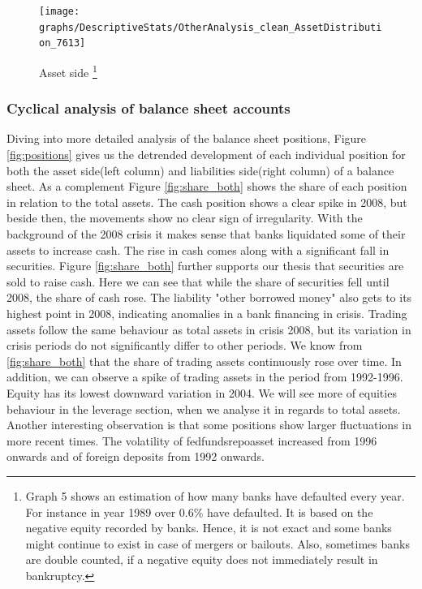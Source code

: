 \documentclass[12pt, a4paper]{article} %
\begin{document}
  
\begin{figure}[hbtp]
\begin{minipage}{\textwidth}
\centering
\caption[1]{Asset side \footnote{Graph 5 shows an estimation of how many banks have defaulted every year. For instance in year 1989 over $0.6\%$ have defaulted. It is based on the negative equity recorded by banks. Hence, it is not exact and some banks might continue to exist in case of mergers or bailouts. Also, sometimes banks are double counted, if a negative equity does not immediately result in bankruptcy.}}
\texttt{[image: graphs/DescriptiveStats/OtherAnalysis\_clean\_AssetDistribution\_7613]}
\label{fig:assets}
\end{minipage}
\end{figure}

\subsubsection{Cyclical analysis of balance sheet accounts}
Diving into more detailed analysis of the balance sheet positions, Figure \ref{fig:positions} gives us the detrended development of each individual position for both the asset side(left column) and liabilities side(right column) of a balance sheet. As a complement Figure \ref{fig:share_both} shows the share of each position in relation to the total assets. 
The cash position shows a clear spike in 2008, but beside then, the movements show no clear sign of irregularity. With the background of the 2008 crisis it makes sense that banks liquidated some of their assets to increase cash. The rise in cash comes along with a significant fall in securities. Figure \ref{fig:share_both} further supports our thesis that securities are sold to raise cash. Here we can see that while the share of securities fell until 2008, the share of cash rose.
The liability "other borrowed money" also gets to its highest point in 2008, indicating anomalies in a bank financing in crisis.
Trading assets follow the same behaviour as total assets in crisis 2008, but its variation in crisis periods do not significantly differ to other periods. We know from \ref{fig:share_both} that the share of trading assets continuously rose over time. In addition, we can observe a spike of trading assets in the period from 1992-1996.
Equity has its lowest downward variation in 2004. We will see more of equities behaviour in the leverage section, when we analyse it in regards to total assets.
Another interesting observation is that some positions show larger fluctuations in more recent times. The volatility of fedfundsrepoasset increased from 1996 onwards and of foreign deposits from 1992 onwards. 
\end{document}
